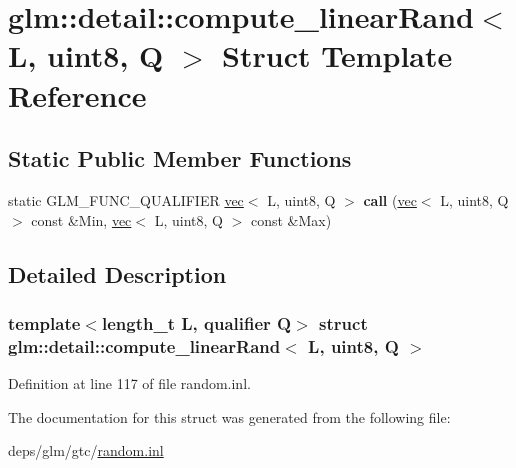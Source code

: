\hypertarget{structglm_1_1detail_1_1compute__linearRand_3_01L_00_01uint8_00_01Q_01_4}{}\section{glm\+:\+:detail\+:\+:compute\+\_\+linear\+Rand$<$ L, uint8, Q $>$ Struct Template Reference}
\label{structglm_1_1detail_1_1compute__linearRand_3_01L_00_01uint8_00_01Q_01_4}
\subsection*{Static Public Member Functions}
\begin{DoxyCompactItemize}
\item 
\mbox{\label{structglm_1_1detail_1_1compute__linearRand_3_01L_00_01uint8_00_01Q_01_4_a4eabc0e8296fcd79054e1057ff7a06f7}} 
static G\+L\+M\+\_\+\+F\+U\+N\+C\+\_\+\+Q\+U\+A\+L\+I\+F\+I\+ER \hyperlink{structglm_1_1vec}{vec}$<$ L, uint8, Q $>$ {\bfseries call} (\hyperlink{structglm_1_1vec}{vec}$<$ L, uint8, Q $>$ const \&Min, \hyperlink{structglm_1_1vec}{vec}$<$ L, uint8, Q $>$ const \&Max)
\end{DoxyCompactItemize}


\subsection{Detailed Description}
\subsubsection*{template$<$length\+\_\+t L, qualifier Q$>$\newline
struct glm\+::detail\+::compute\+\_\+linear\+Rand$<$ L, uint8, Q $>$}



Definition at line 117 of file random.\+inl.



The documentation for this struct was generated from the following file\+:\begin{DoxyCompactItemize}
\item 
deps/glm/gtc/\hyperlink{random_8inl}{random.\+inl}\end{DoxyCompactItemize}
